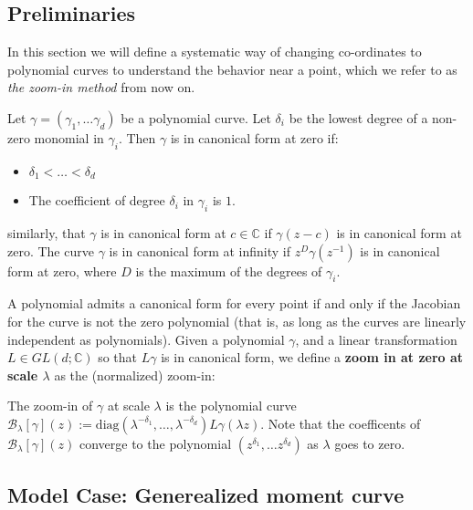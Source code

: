 	\subsection{Preliminaries} %
	\label{sub:prelim}

	In this section we will define a systematic way of changing co-ordinates to polynomial curves to understand the behavior near a point, which we refer to as \textit{the zoom-in method} from now on. 

	\begin{defi}
		Let $\gamma = (\gamma_1, \dots \gamma_d)$ be a polynomial curve. Let $\delta_i$ be the lowest degree of a non-zero monomial in $\gamma_i$. Then $\gamma$ is in canonical form at zero if:

		\begin{itemize}
			\item $\delta_1< \dots < \delta_d$
			\item The coefficient of degree $\delta_i$ in $\gamma_i$ is $1$.
		\end{itemize}
		similarly, that $\gamma$ is in canonical form at $c\in\mathbb C$ if $\gamma(z-c)$ is in canonical form at zero. The curve $\gamma$ is in canonical form at infinity if $z^D \gamma(z^{-1})$ is in canonical form at zero, where $D$ is the maximum of the degrees of $\gamma_i$.
	\end{defi}

	A polynomial admits a canonical form for every point if and only if the Jacobian for the curve is not the zero polynomial (that is, as long as the curves are linearly independent as polynomials). Given a polynomial $\gamma$, and a linear transformation $L\in GL(d;\mathbb C)$ so that $L \gamma$ is in canonical form, we define a \textbf{zoom in at zero at scale $\lambda$} as the (normalized) zoom-in:

	\begin{defi}
	 The zoom-in of $\gamma$ at scale $\lambda$ is the polynomial curve $\mathcal B_\lambda [\gamma](z) := \text{diag}(\lambda^{-\delta_1}, \dots, \lambda^{-\delta_d})L \gamma(\lambda z)$. Note that the coefficents of $\mathcal B_\lambda [\gamma](z)$ converge to the polynomial $(z^{\delta_1}, \dots z^{\delta_d})$ as $\lambda$ goes to zero.
	\end{defi}
	
	\subsection{Model Case: Generealized moment curve} %
	\label{sub:model_case_generealized_moment_curve}
	

